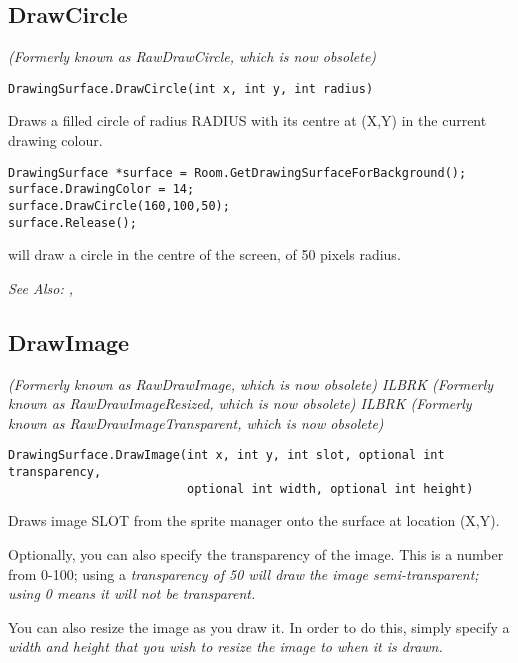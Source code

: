 \subsection{DrawCircle}\label{DrawingSurface.DrawCircle}%

\it{(Formerly known as RawDrawCircle, which is now obsolete)}

\begin{verbatim}
DrawingSurface.DrawCircle(int x, int y, int radius)
\end{verbatim}
Draws a filled circle of radius RADIUS with its centre at (X,Y) in the current drawing colour.

\begin{verbatim}
DrawingSurface *surface = Room.GetDrawingSurfaceForBackground();
surface.DrawingColor = 14;
surface.DrawCircle(160,100,50);
surface.Release();
\end{verbatim}
will draw a circle in the centre of the screen, of 50 pixels radius.

\it{See Also:} ,


\subsection{DrawImage}\label{DrawingSurface.DrawImage}%

\it{(Formerly known as RawDrawImage, which is now obsolete)} ILBRK
\it{(Formerly known as RawDrawImageResized, which is now obsolete)} ILBRK
\it{(Formerly known as RawDrawImageTransparent, which is now obsolete)}

\begin{verbatim}
DrawingSurface.DrawImage(int x, int y, int slot, optional int transparency,
                         optional int width, optional int height)
\end{verbatim}
Draws image SLOT from the sprite manager onto the surface at location (X,Y).

Optionally, you can also specify the transparency of the image. This is a number
from 0-100; using a \it{transparency} of 50 will draw the image semi-transparent;
using 0 means it will not be transparent.

You can also resize the image as you draw it. In order to do this, simply specify
a \it{width} and \it{height} that you wish to resize the image to when it is drawn.


